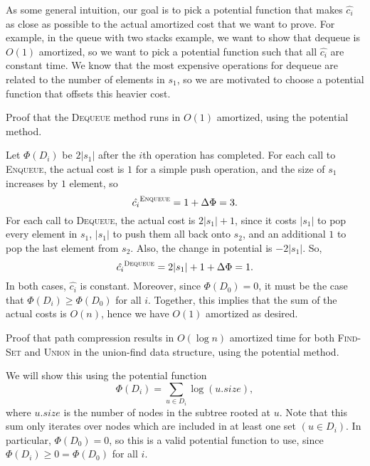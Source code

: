 As some general intuition, our goal is to pick a potential function that makes $\hat{c_i}$ as close as possible to the actual amortized cost that we want to prove. For example, in the queue with two stacks example, we want to show that dequeue is $O(1)$ amortized, so we want to pick a potential function such that all $\hat{c_i}$ are constant time. We know that the most expensive operations for dequeue are related to the number of elements in $s_1$, so we are motivated to choose a potential function that offsets this heavier cost.

\begin{example}
\exlabel

Proof that the \textsc{Dequeue} method runs in $O(1)$ amortized, using the potential method.
\end{example}

Let $\Phi(D_i)$ be $2\vert s_1\vert$ after the $i$th operation has completed. For each call to \textsc{Enqueue}, the actual cost is $1$ for a simple push operation, and the size of $s_1$ increases by $1$ element, so 
\[\hat{c_i}^{\textsc{Enqueue}} = 1 + \Delta \Phi = 3.\]
For each call to \textsc{Dequeue}, the actual cost is $2\vert s_1\vert+1$, since it costs $\vert s_1\vert$ to pop every element in $s_1$, $\vert s_1\vert$ to push them all back onto $s_2$, and an additional $1$ to pop the last element from $s_2$. Also, the change in potential is $-2\vert s_1\vert$. So, 
\[\hat{c_i}^{\textsc{Dequeue}} = 2\vert s_1\vert + 1 + \Delta \Phi = 1.\]
In both cases, $\hat{c_i}$ is constant. Moreover, since $\Phi(D_0) = 0$, it must be the case that $\Phi(D_i)\geq \Phi(D_0)$ for all $i$. Together, this implies that the sum of the actual costs is $O(n)$, hence we have $O(1)$ amortized as desired.

\hypertarget{pathcompression}{}
\begin{example}
\exlabel

Proof that path compression results in $O(\log n)$ amortized time for both \textsc{Find-Set} and \textsc{Union} in the union-find data structure, using the potential method. 
\end{example}

We will show this using the potential function 
\[\Phi(D_i) = \sum_{u\in D_i}\log (u.size),\]
where $u.size$ is the number of nodes in the subtree rooted at $u$. Note that this sum only iterates over nodes which are included in at least one set $(u\in D_i)$. In particular, $\Phi(D_0) = 0$, so this is a valid potential function to use, since $\Phi(D_i)\geq 0 = \Phi(D_0)$ for all $i$. 

